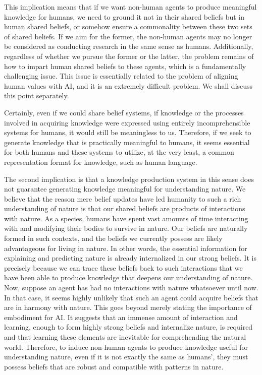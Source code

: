 This implication means that if we want non-human agents to produce meaningful knowledge for humans, we need to ground it not in their shared beliefs but in human shared beliefs, or somehow ensure a commonality between these two sets of shared beliefs. If we aim for the former, the non-human agents may no longer be considered as conducting research in the same sense as humans. Additionally, regardless of whether we pursue the former or the latter, the problem remains of how to impart human shared beliefs to these agents, which is a fundamentally challenging issue. This issue is essentially related to the problem of aligning human values with AI, and it is an extremely difficult problem. We shall discuss this point separately.

Certainly, even if we could share belief systems, if knowledge or the processes involved in acquiring knowledge were expressed using entirely incomprehensible systems for humans, it would still be meaningless to us. Therefore, if we seek to generate knowledge that is practically meaningful to humans, it seems essential for both humans and these systems to utilize, at the very least, a common representation format for knowledge, such as human language.

The second implication is that a knowledge production system in this sense does not guarantee generating knowledge meaningful for understanding nature. We believe that the reason mere belief updates have led humanity to such a rich understanding of nature is that our shared beliefs are products of interactions with nature. As a species, humans have spent vast amounts of time interacting with and modifying their bodies to survive in nature. Our beliefs are naturally formed in such contexts, and the beliefs we currently possess are likely advantageous for living in nature. In other words, the essential information for explaining and predicting nature is already internalized in our strong beliefs. It is precisely because we can trace these beliefs back to such interactions that we have been able to produce knowledge that deepens our understanding of nature. Now, suppose an agent has had no interactions with nature whatsoever until now. In that case, it seems highly unlikely that such an agent could acquire beliefs that are in harmony with nature. This goes beyond merely stating the importance of embodiment for AI. It suggests that an immense amount of interaction and learning, enough to form highly strong beliefs and internalize nature, is required and that learning these elements are inevitable for comprehending the natural world. Therefore, to induce non-human agents to produce knowledge useful for understanding nature, even if it is not exactly the same as humans', they must possess beliefs that are robust and compatible with patterns in nature.

